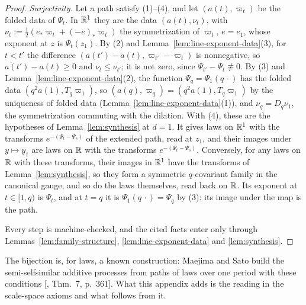 \begin{proof}
\emph{Surjectivity.} Let a path satisfy (1)--(4), and let $(a(t), \varpi_t)$ be the folded data of
$\Psi_t$. In $\mathbb{R}^1$ they are the \Levy{} data $(a(t), \nu_t)$, with
$\nu_t := \tfrac12(e_*\varpi_t + (-e)_*\varpi_t)$ the symmetrization of $\varpi_t$, $e = e_1$,
whose exponent at $z$ is $\Psi_t(z_1)$. By (2) and Lemma~\ref{lem:line-exponent-data}(3), for
$t < t'$ the difference $(a(t') - a(t), \varpi_{t'} - \varpi_t)$ is nonnegative, so
$a(t') - a(t) \ge 0$ and $\nu_t \le \nu_{t'}$; it is not zero, since
$\Psi_{t'} - \Psi_t \not\equiv 0$. By (3) and Lemma~\ref{lem:line-exponent-data}(2), the
function $\Psi_q = \Psi_1(q\,\cdot)$ has the folded data $(q^2a(1), T_q\varpi_1)$, so
$(a(q), \varpi_q) = (q^2a(1), T_q\varpi_1)$ by the uniqueness of folded data
(Lemma~\ref{lem:line-exponent-data}(1)), and $\nu_q = D_q\nu_1$, the symmetrization commuting
with the dilation. With (4), these are the hypotheses of Lemma~\ref{lem:synthesis} at $d = 1$.
It gives laws on $\mathbb{R}^1$ with the transforms $e^{-(\Psi_t - \Psi_s)}$ of the extended path, read
at $z_1$, and their images under $y \mapsto y_1$ are laws on $\mathbb{R}$ with the transforms
$e^{-(\Psi_t - \Psi_s)}$. Conversely, for any laws on $\mathbb{R}$ with these transforms, their images
in $\mathbb{R}^1$ have the transforms of Lemma~\ref{lem:synthesis}, so they form a symmetric $q$-covariant
family in the canonical gauge, and so do the laws themselves, read back on $\mathbb{R}$. Its exponent at
$t \in [1, q)$ is $\Psi_t$, and at $t = q$ it is $\Psi_1(q\,\cdot) = \Psi_q$ by (3): its image under
the map is the path.

Every step is machine-checked, and the cited facts enter only through
Lemmas~\ref{lem:family-structure}, \ref{lem:line-exponent-data} and \ref{lem:synthesis}.
\end{proof}

The bijection is, for laws, a known construction: Maejima and Sato build the semi-selfsimilar
additive processes from paths of laws over one period with these conditions
[, Thm.~7, p.~361]. What this appendix adds is the reading in the
scale-space axioms and what follows from it.

